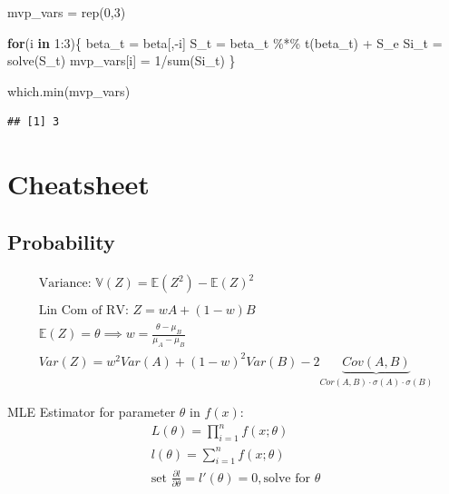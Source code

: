\documentclass[
  oneside]{book}
\newenvironment{Shaded}{\begin{snugshade}}{\end{snugshade}}
\newcommand{\ControlFlowTok}[1]{\textcolor[rgb]{0.13,0.29,0.53}{\textbf{#1}}}
\newcommand{\DecValTok}[1]{\textcolor[rgb]{0.00,0.00,0.81}{#1}}
\newcommand{\FunctionTok}[1]{\textcolor[rgb]{0.00,0.00,0.00}{#1}}
\newcommand{\NormalTok}[1]{#1}
\newcommand{\OtherTok}[1]{\textcolor[rgb]{0.56,0.35,0.01}{#1}}
\newcommand{\SpecialCharTok}[1]{\textcolor[rgb]{0.00,0.00,0.00}{#1}}
\begin{document}
\begin{Shaded}
\begin{Highlighting}[]
\NormalTok{mvp\_vars }\OtherTok{=} \FunctionTok{rep}\NormalTok{(}\DecValTok{0}\NormalTok{,}\DecValTok{3}\NormalTok{)}

\ControlFlowTok{for}\NormalTok{(i }\ControlFlowTok{in} \DecValTok{1}\SpecialCharTok{:}\DecValTok{3}\NormalTok{)\{}
\NormalTok{  beta\_t }\OtherTok{=}\NormalTok{ beta[,}\SpecialCharTok{{-}}\NormalTok{i]}
\NormalTok{  S\_t }\OtherTok{=}\NormalTok{ beta\_t }\SpecialCharTok{\%*\%} \FunctionTok{t}\NormalTok{(beta\_t) }\SpecialCharTok{+}\NormalTok{ S\_e}
\NormalTok{  Si\_t }\OtherTok{=} \FunctionTok{solve}\NormalTok{(S\_t)}
\NormalTok{  mvp\_vars[i] }\OtherTok{=} \DecValTok{1}\SpecialCharTok{/}\FunctionTok{sum}\NormalTok{(Si\_t)}
\NormalTok{\}}

\FunctionTok{which.min}\NormalTok{(mvp\_vars)}
\end{Highlighting}
\end{Shaded}

\begin{verbatim}
## [1] 3
\end{verbatim}

\hypertarget{cheatsheet}{%
\chapter{Cheatsheet}\label{cheatsheet}}

\hypertarget{probability}{%
\section{Probability}\label{probability}}

\[
\begin{gathered}
\text{Variance: } \mathbb{V}(Z) = \mathbb{E}(Z^{2})-\mathbb{E}(Z)^{2}\\
\\
\text{Lin Com of RV: } Z = wA + (1-w)B\\ 
\mathbb{E}(Z) = \theta \implies w = \frac{\theta -\mu_{B}}{\mu_{A}-\mu_{B}}\\
Var(Z) = w^{2}Var(A) + (1-w)^{2}Var(B) - 2\underbrace{ Cov(A,B) }_{ Cor(A,B)\cdot \sigma(A)\cdot\sigma(B) }
\end{gathered}
\]

MLE Estimator for parameter \(\theta\) in \(f(x)\):
\[
\begin{gathered}
L(\theta) = \prod^{n}_{i=1} f(x;\theta)\\
l(\theta) = \sum^{n}_{i=1} f(x;\theta)\\
\text{set } \frac{ \partial l }{ \partial \theta } = l'(\theta) = 0, \text{solve for } \theta 
\end{gathered}
\]
\end{document}
